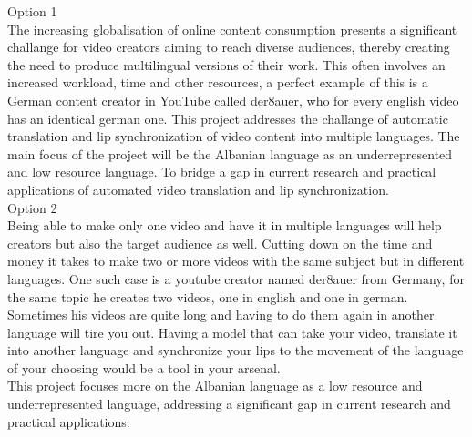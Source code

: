 \documentclass[12pt]{article}
\begin{document}
Option 1\\
The increasing globalisation of online content consumption presents a significant challange for video creators aiming to reach diverse audiences, thereby creating the need to produce multilingual versions of their work. This often involves an increased workload, time and other resources, a perfect example of this is a German content creator in YouTube called der8auer, who for every english video has an identical german one. This project addresses the challange of automatic translation and lip synchronization of video content into multiple languages. 
The main focus of the project will be the Albanian language as an underrepresented and low resource language. To bridge a gap in current research and practical applications of automated video translation and lip synchronization.\\
Option 2\\
Being able to make only one video and have it in multiple languages will help creators but also the target audience as well. Cutting down on the time and money it takes to make two or more videos with the same subject but in different languages. One such case is a youtube creator named der8auer from Germany, for the same topic he creates two videos, one in english and one in german. Sometimes his videos are quite long and having to do them again in another language will tire you out. Having a model that can take your video, translate it into another language and synchronize your lips to the movement of the language of your choosing would be a tool in your arsenal.\\
This project focuses more on the Albanian language as a low resource and underrepresented language, addressing a significant gap in current research and practical applications. \\
\end{document}
